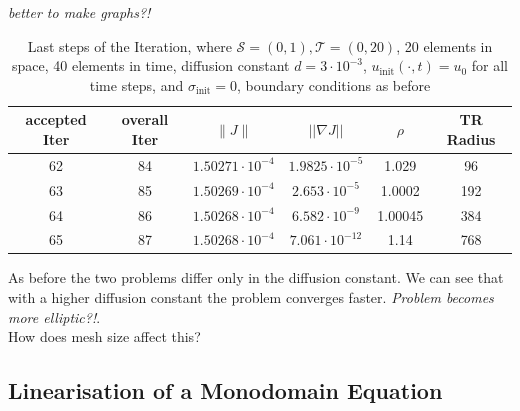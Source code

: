 \documentclass[../draft_1.tex]{subfiles}
\begin{document}
\textit{better to make graphs?!}
\begin{table}[ht!]
	\begin{center}
		\begin{tabular}{|c | c | c | c | c | c |} 
			\hline
			accepted Iter & overall Iter & $ \| J \|  $ & $|| \nabla J ||$ & $\rho $ & TR Radius \\ 
			\hline\hline
			62 & 84 & $1.50271 \cdot 10^{-4}$ & $1.9825 \cdot 10^{-5}$ &  1.029 & 96 \\ 
			\hline
			63 & 85 & $1.50269 \cdot 10^{-4}$ & $2.653 \cdot 10^{-5}$ & 1.0002 & 192 \\
			\hline
			64 & 86 & $1.50268 \cdot 10^{-4}$ & $6.582 \cdot 10^{-9}$ & 1.00045 & 384 \\
			\hline
			65 & 87 & $1.50268 \cdot 10^{-4}$ & $7.061 \cdot 10^{-12}$ & 1.14 & 768 \\
			\hline
			
		\end{tabular}
	\end{center}
	\caption{Last steps of the Iteration, where $\mathcal{S} = (0, 1), \mathcal{T} = (0, 20)$, 20 elements in space, 40 elements in time, diffusion constant $d=3 \cdot 10^{-3}$, $u_{\text{init}} (\cdot,t)= u_0$ for all time steps, and $\sigma_{\text{init}} = 0$, boundary conditions as before}
\end{table}

As before the two problems differ only in the diffusion constant. We can see that with a higher diffusion constant the problem converges faster. \textit{Problem becomes more elliptic?!}.
\\
How does mesh size affect this?

\FloatBarrier
\subsection{Linearisation of a Monodomain Equation}
\end{document}
